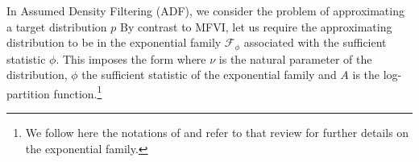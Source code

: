 \vspace*{2cm}
In Assumed Density Filtering (ADF), we consider the problem of approximating a target distribution $p$
By contrast to MFVI, let us require the approximating distribution to be in the exponential family $\mathcal F_\phi$ associated with the sufficient statistic $\phi$. This imposes the form
where $\nu$ is the natural parameter of the distribution, $\phi$ the sufficient statistic of the exponential family and $A$ is the log-partition function.\footnote{We follow here the notations of \citet{wainwright08} and refer to that review for further details on the exponential family.} \\
%
%
%
